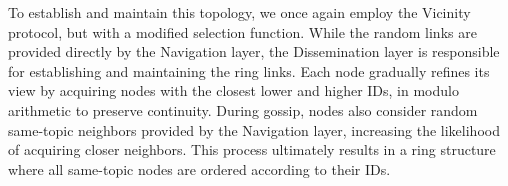 To establish and maintain this topology, we once again employ the Vicinity protocol, but with a modified selection function.
While the random links are provided directly by the Navigation layer, the Dissemination layer is responsible for establishing and maintaining the ring links.
Each node gradually refines its view by acquiring nodes with the closest lower and higher IDs, in modulo arithmetic to preserve continuity.
During gossip, nodes also consider random same-topic neighbors provided by the Navigation layer, increasing the likelihood of acquiring closer neighbors.
This process ultimately results in a ring structure where all same-topic nodes are ordered according to their IDs.


